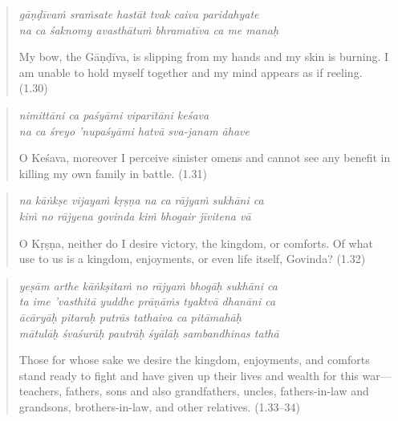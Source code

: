 \documentclass[12pt, twoside, openright]{memoir}
\begin{document}
\par
\begin{verse}
\textit{gāṇḍīvaṁ sraṁsate hastāt tvak caiva paridahyate} \\
\textit{na ca śaknomy avasthātuṁ bhramatīva ca me manaḥ}

\noindent My bow, the Gāṇḍīva, is slipping from my hands and my skin is burning. I am unable to hold myself together and my mind appears as if reeling. (1.30)
\end{verse}
\par



\par
\begin{verse}
\textit{nimittāni ca paśyāmi viparītāni keśava} \\
\textit{na ca śreyo ’nupaśyāmi hatvā sva-janam āhave}

\noindent O Keśava, moreover I perceive sinister omens and cannot see any benefit in killing my own family in battle. (1.31)
\end{verse}
\par



\par
\begin{verse}
\textit{na kāṅkṣe vijayaṁ kṛṣṇa na ca rājyaṁ sukhāni ca} \\
\textit{kiṁ no rājyena govinda kiṁ bhogair jīvitena vā}

\noindent O Kṛṣṇa, neither do I desire victory, the kingdom, or comforts. Of what use to us is a kingdom, enjoyments, or even life itself, Govinda? (1.32)
\end{verse}
\par



\par
\begin{verse}
\textit{yeṣām arthe kāṅkṣitaṁ no rājyaṁ bhogāḥ sukhāni ca} \\
\textit{ta ime ’vasthitā yuddhe prāṇāṁs tyaktvā dhanāni ca} \\
\textit{ācāryāḥ pitaraḥ putrās tathaiva ca pitāmahāḥ} \\
\textit{mātulāḥ śvaśurāḥ pautrāḥ śyālāḥ sambandhinas tathā}

\noindent Those for whose sake we desire the kingdom, enjoyments, and comforts stand ready to fight and have given up their lives and wealth for this war---teachers, fathers, sons and also grandfathers, uncles, fathers-in-law and grandsons, brothers-in-law, and other relatives. (1.33–34)
\end{verse}
\par
\end{document}
